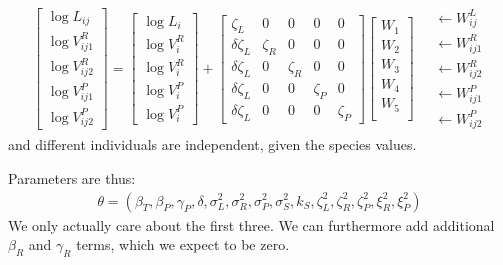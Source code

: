 \documentclass{article}
\begin{document}
\begin{align}
\begin{bmatrix}
    \log L_{ij} \\
    \log V_{ij1}^R \\ \log V_{ij2}^R  \\
    \log V_{ij1}^P \\ \log V_{ij2}^P  
\end{bmatrix}
=
\begin{bmatrix}
    \log L_{i} \\
    \log V_{i}^R \\ \log V_{i}^R  \\
    \log V_{i}^P \\ \log V_{i}^P  
\end{bmatrix}
+
\begin{bmatrix}
    \zeta_L  &   0 & 0  & 0  & 0 \\
    \delta \zeta_L  &  \zeta_R  &  0  & 0 & 0 \\ 
    \delta \zeta_L  &  0  & \zeta_R  & 0 & 0\\ 
    \delta \zeta_L  & 0 & 0 &  \zeta_P  & 0  \\ 
    \delta \zeta_L  & 0 & 0 &  0 & \zeta_P 
\end{bmatrix}
\begin{bmatrix}
W_1 \\W_2 \\W_3 \\W_4 \\ W_5  \\ 
\end{bmatrix}
\quad \begin{matrix}
    \leftarrow W^L_{ij}  \\
    \leftarrow W^R_{ij1}  \\
    \leftarrow W^R_{ij2}  \\
    \leftarrow  W^P_{ij1} \\ 
    \leftarrow  W^P_{ij2} 
\end{matrix}
\end{align}
and different individuals are independent, given the species values.

Parameters are thus: 
\begin{align}
    \theta = (
    \beta_T,
    \beta_P,
    \gamma_P,
    \delta,
    \sigma^2_L, 
    \sigma^2_R, 
    \sigma^2_P, 
    \sigma^2_S,
    k_S,
    \zeta^2_L,
    \zeta^2_R,
    \zeta^2_P,
    \xi^2_R,
    \xi^2_P
    )
\end{align}
We only actually care about the first three.
We can furthermore add additional $\beta_R$ and $\gamma_R$ terms, which we expect to be zero.
\end{document}
